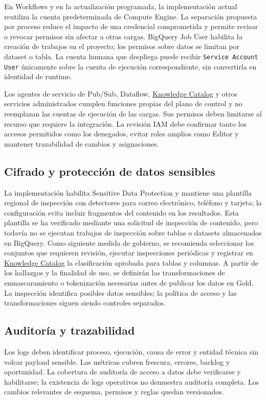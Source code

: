 \documentclass[11pt,a4paper]{article}
\newcommand{\KnowledgeCatalog}{\href{https://console.cloud.google.com/dataplex/studio?referrer=search\&authuser=0\&project=prj-codenid}{Knowledge Catalog}}
\begin{document}
En Workflows y en la actualización programada, la implementación actual reutiliza la cuenta predeterminada de Compute Engine. La separación propuesta por proceso reduce el impacto de una credencial comprometida y permite revisar o revocar permisos sin afectar a otras cargas. BigQuery Job User habilita la creación de trabajos en el proyecto; los permisos sobre datos se limitan por dataset o tabla. La cuenta humana que despliega puede recibir \texttt{Service Account User} únicamente sobre la cuenta de ejecución correspondiente, sin convertirla en identidad de runtime.

Los agentes de servicio de Pub/Sub, Dataflow, \KnowledgeCatalog{} y otros servicios administrados cumplen funciones propias del plano de control y no reemplazan las cuentas de ejecución de las cargas. Sus permisos deben limitarse al recurso que requiere la integración. La revisión IAM debe confirmar tanto los accesos permitidos como los denegados, evitar roles amplios como Editor y mantener trazabilidad de cambios y asignaciones.

\subsection{Cifrado y protección de datos sensibles}
La implementación habilita Sensitive Data Protection y mantiene una plantilla regional de inspección con detectores para correo electrónico, teléfono y tarjeta; la configuración evita incluir fragmentos del contenido en los resultados. Esta plantilla se ha verificado mediante una solicitud de inspección de contenido, pero todavía no se ejecutan trabajos de inspección sobre tablas o datasets almacenados en BigQuery. Como siguiente medida de gobierno, se recomienda seleccionar los conjuntos que requieren revisión, ejecutar inspecciones periódicas y registrar en \KnowledgeCatalog{} la clasificación aprobada para tablas y columnas. A partir de los hallazgos y la finalidad de uso, se definirán las transformaciones de enmascaramiento o tokenización necesarias antes de publicar los datos en Gold. La inspección identifica posibles datos sensibles; la política de acceso y las transformaciones siguen siendo controles separados.

\subsection{Auditoría y trazabilidad}
Los logs deben identificar proceso, ejecución, causa de error y entidad técnica sin volcar payload sensible. Las métricas cubren frescura, errores, backlog y oportunidad. La cobertura de auditoría de acceso a datos debe verificarse y habilitarse; la existencia de logs operativos no demuestra auditoría completa. Los cambios relevantes de esquema, permisos y reglas quedan versionados.
\end{document}

